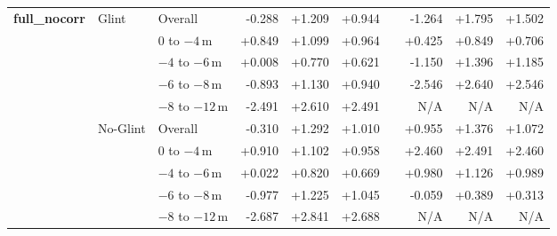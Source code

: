 \begin{table}[htbp]
{\begin{tabular}{lll rrr c rrr}
\multirow{10}{*}{\textbf{full\_nocorr}} & \multirow{5}{*}{Glint} & Overall              &  -0.288 & +1.209 & +0.944 & &  -1.264 & +1.795 & +1.502 \\
                           &                      & $0$ to $-4$\,m       &  +0.849 & +1.099 & +0.964 & &  +0.425 & +0.849 & +0.706 \\
                           &                      & $-4$ to $-6$\,m      &  +0.008 & +0.770 & +0.621 & &  -1.150 & +1.396 & +1.185 \\
                           &                      & $-6$ to $-8$\,m      &  -0.893 & +1.130 & +0.940 & &  -2.546 & +2.640 & +2.546 \\
                           &                      & $-8$ to $-12$\,m     &  -2.491 & +2.610 & +2.491 & &     N/A &   N/A &   N/A \\
\cmidrule(lr){2-10}
                           & \multirow{5}{*}{No-Glint} & Overall              &  -0.310 & +1.292 & +1.010 & &  +0.955 & +1.376 & +1.072 \\
                           &                      & $0$ to $-4$\,m       &  +0.910 & +1.102 & +0.958 & &  +2.460 & +2.491 & +2.460 \\
                           &                      & $-4$ to $-6$\,m      &  +0.022 & +0.820 & +0.669 & &  +0.980 & +1.126 & +0.989 \\
                           &                      & $-6$ to $-8$\,m      &  -0.977 & +1.225 & +1.045 & &  -0.059 & +0.389 & +0.313 \\
                           &                      & $-8$ to $-12$\,m     &  -2.687 & +2.841 & +2.688 & &     N/A &   N/A &   N/A \\
\bottomrule
\end{tabular}%
}
\end{table}